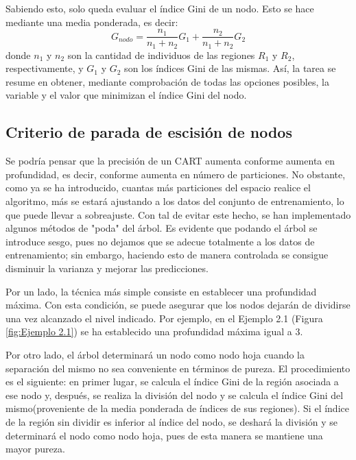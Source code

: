 \documentclass[12pt,twoside]{article}
\begin{document}
Sabiendo esto, solo queda evaluar el índice Gini de un nodo. Esto se hace mediante una media ponderada, es decir:
\begin{equation*}
G_{nodo} = \frac{n_1}{n_1 + n_2}G_1 + \frac{n_2}{n_1 + n_2}G_2
\end{equation*}
donde  $n_1$ y $n_2$ son la cantidad de individuos de las regiones $R_1$ y $R_2$, respectivamente, y $G_1$ y $G_2$ son los índices Gini de las mismas. Así, la tarea se resume en obtener, mediante comprobación de todas las opciones posibles, la variable y el valor que minimizan el índice Gini del nodo.




\subsection{Criterio de parada de escisión de nodos}
Se podría pensar que la precisión de un CART aumenta conforme aumenta en profundidad, es decir, conforme aumenta en número de particiones. No obstante, como ya se ha introducido, cuantas más particiones del espacio realice el algoritmo, más se estará ajustando a los datos del conjunto de entrenamiento, lo que puede llevar a sobreajuste. Con tal de evitar este hecho, se han implementado algunos métodos de "poda" del árbol. Es evidente que podando el árbol se introduce sesgo, pues no dejamos que se adecue totalmente a los datos de entrenamiento; sin embargo, haciendo esto de manera controlada se consigue disminuir la varianza y mejorar las predicciones.

Por un lado, la técnica más simple consiste en establecer una profundidad máxima. Con esta condición, se puede asegurar que los nodos dejarán de dividirse una vez alcanzado el nivel indicado. Por ejemplo, en el Ejemplo 2.1 (Figura \ref{fig:Ejemplo 2.1}) se ha establecido una profundidad máxima igual a 3.

Por otro lado, el árbol determinará un nodo como nodo hoja cuando la separación del mismo no sea conveniente en términos de pureza. El procedimiento es el siguiente: en primer lugar, se calcula el índice Gini de la región asociada a ese nodo y, después, se realiza la división del nodo y se calcula el índice Gini del mismo(proveniente de la media ponderada de índices de sus regiones). Si el índice de la región sin dividir es inferior al índice del nodo, se deshará la división y se determinará el nodo como nodo hoja, pues de esta manera se mantiene una mayor pureza.
\end{document}

